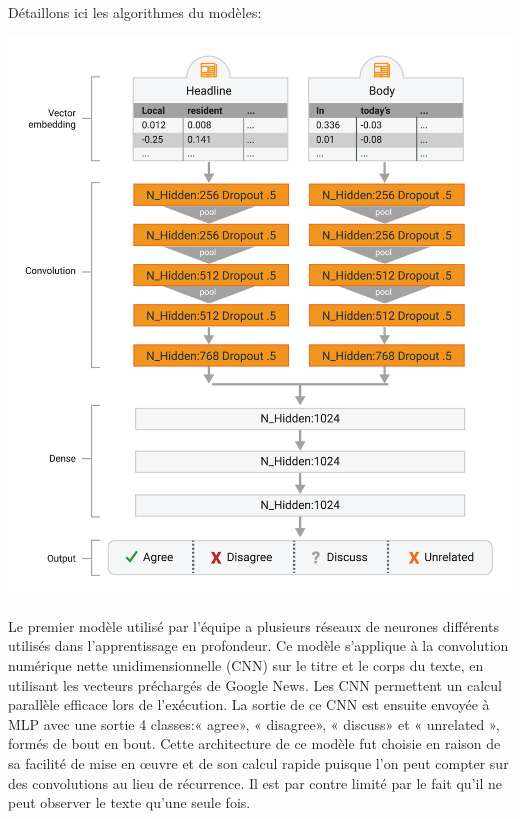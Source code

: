 \documentclass[11pt,a4paper,oldfontcommands]{memoir}
\begin{document}
Détaillons ici les algorithmes du modèles:
\begin{center}
 \includegraphics[scale=0.5]{../../img/model/solat_in_the_swen/deep_model_light.png}
 \label{fig1}
\end{center}

Le premier modèle utilisé par l'équipe a plusieurs réseaux de neurones différents utilisés dans l'apprentissage en profondeur.
Ce modèle s'applique à la convolution numérique nette unidimensionnelle (CNN) sur le titre et le corps du texte, en utilisant les vecteurs préchargés de Google News.
Les CNN permettent un calcul parallèle efficace lors de l'exécution.
La sortie de ce CNN est ensuite envoyée à  MLP avec une sortie 4 classes:« agree», « disagree», « discuss» et « unrelated », formés de bout en bout.
Cette architecture de ce modèle fut choisie en raison de sa facilité de mise en œuvre et de son calcul rapide puisque l'on peut compter sur des convolutions au lieu de récurrence.
Il est par contre limité par le fait qu'il ne peut observer le texte qu'une seule fois.
\end{document}
